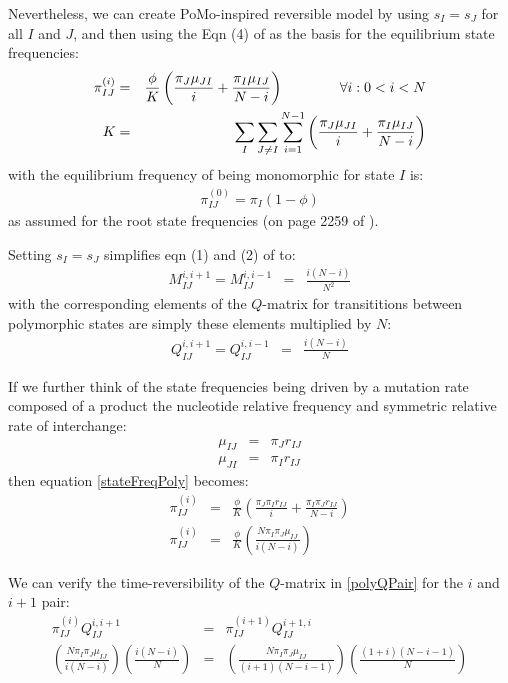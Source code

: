 \documentclass{llncs}
\newcommand{\polyProb}{\ensuremath{\phi}}}
\newcommand{\Knorm}{\ensuremath{K}}}
\newcommand{\pomo}{PoMo\xspace}
\begin{document}
Nevertheless, we can create \pomo-inspired reversible model by using
    $s_I= s_J$ for all $I$ and $J$, and then using the Eqn (4) of \cite{DeMaioSK2013}
    as the basis for the equilibrium state frequencies:
\begin{eqnarray}
\pi_{IJ}^{(i)} & = & \frac{\polyProb}{\Knorm }\left(
    \frac{\pi_J\mu_{JI}}{i} + \frac{\pi_I\mu_{IJ}}{N-i}\right) \hskip 4em \forall i: 0<i<N \label{stateFreqPoly}\\
    \Knorm  & = & \sum_I \sum_{J\neq I}\sum_{i=1}^{N-1} \left(
    \frac{\pi_J\mu_{JI}}{i} + \frac{\pi_I\mu_{IJ}}{N-i}\right) \label{KnormDef}
\end{eqnarray}
with the equilibrium frequency of being monomorphic for state $I$ is:
\begin{eqnarray}
    \pi_{IJ}^{(0)} = \pi_I(1-\polyProb) \label{monoStateFreq}
\end{eqnarray}
as assumed for the root state frequencies (on page 2259 of \cite{DeMaioSK2013}).

Setting $s_I=s_J$ simplifies eqn (1) and (2) of \cite{DeMaioSK2013} to:
\begin{eqnarray}
 M_{IJ}^{i,i+1}  = M_{IJ}^{i,i-1} & = & \frac{i(N-i)}{N^2}
\end{eqnarray}
with the corresponding elements of the $Q$-matrix for 
    transititions between polymorphic states are simply
    these elements multiplied by $N$:
\begin{eqnarray}
    Q_{IJ}^{i,i+1}  = Q_{IJ}^{i,i-1} & = & \frac{i(N-i)}{N} \label{polyQPair}
\end{eqnarray}

If we further think of the state frequencies being driven by a mutation rate composed of a product
    the nucleotide relative frequency and symmetric relative rate of interchange:
\begin{eqnarray}
 \mu_{IJ} & = &\pi_J r_{IJ} \\
 \mu_{JI} & = &\pi_I r_{IJ} 
\end{eqnarray}
then equation \ref{stateFreqPoly} becomes:
\begin{eqnarray}
\pi_{IJ}^{(i)} & = & \frac{\polyProb}{\Knorm }\left( \frac{\pi_J\pi_I r_{IJ}}{i} + \frac{\pi_I\pi_J r_{IJ}}{N-i}\right) \nonumber\\
     \pi_{IJ}^{(i)} & = & \frac{\polyProb}{\Knorm }\left( \frac{N\pi_I\pi_J\mu_{IJ}}{i(N-i)}\right) \label{polyStateFreqSimplified}
\end{eqnarray}

We can verify the time-reversibility of the $Q$-matrix in \ref{polyQPair} for the $i$ and $i+1$ pair:
\begin{eqnarray}
    \pi_{IJ}^{(i)} Q_{IJ}^{i,i+1} & = & \pi_{IJ}^{(i+1)} Q_{IJ}^{i+1,i} \nonumber \\
    \left( \frac{N\pi_I\pi_J\mu_{IJ}}{i(N-i)}\right) \left(\frac{i(N-i)}{N}\right) & = & \left( \frac{N\pi_I\pi_J\mu_{IJ}}{(i+1)(N-i-1)}\right)\left(\frac{(1+i)(N-i-1)}{N}\right) \nonumber
\end{eqnarray}
\end{document}
